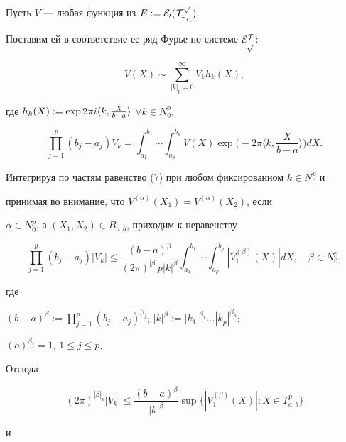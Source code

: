 \begin{pf}


Пусть $V$ --- любая функция из $E:=\cal{E} _0(T_{a,b}^p)$.


Поставим ей в соответствие ее ряд Фурье по системе $\cal{E} _p^T$:


\begin{equation}


V(X)\sim\sum^{\infty}_{|k|_p=0}V_kh_k(X),


\end{equation}


где $h_k(X):=\exp 2\pi i\langle k,\frac{X}{b-a}\rangle$ $\forall k\in N_0^p$,


\begin{equation}


\prod^p_{j=1}(b_j-a_j)V_k=\int^{b_1}_{a_1}\dotsb\int^


{b_p}_{a_p}V(X)\exp


\bigg(-2\pi \Big\langle k,\frac{X}{b-a}\Big\rangle\bigg)dX.


\end{equation}


Интегрируя по частям равенство (7) при любом фиксированном $k\in N_0^p$ и


принимая во внимание, что $V^{(\alpha)}(X_1)=V^{(\alpha)}(X_2)$, если


$\alpha\in N_0^p$, а $(X_1,X_2)\in B_{a,b}$, приходим к неравенству


$$


\prod^p_{j=1}(b_j-a_j)|V_k|\leqslant\dfrac{(b-


a)^{\beta}}{(2\pi)^{|\beta|}


p|k|^{\beta}}\int_{a_1}^{b_1}\dotsb\int_{a_p}^{b_p}|V_


1^{(\beta)}(X)|dX, \quad \beta\in N_0^p,


$$


где


$(b-a)^{\beta}:=\prod\limits^p_{j=1}(b_j-a_j)^


{\beta_j}$; $|k|^{\beta}:=|k_1|^{\beta_1}\dotsc|k_p|^{\beta_p}$;


$(o)^{\beta_j}=1$, $1\leqslant j\leqslant p$.


Отсюда


$$


(2\pi)^{|\beta|_p}|V_k|\leqslant\frac{(b-a)^


{\beta}}{|k|^{\beta}}\sup\{|V_1^{(\beta)}(X)|: X\in T^p_{a,b}\}


$$


и



\end{pf}
